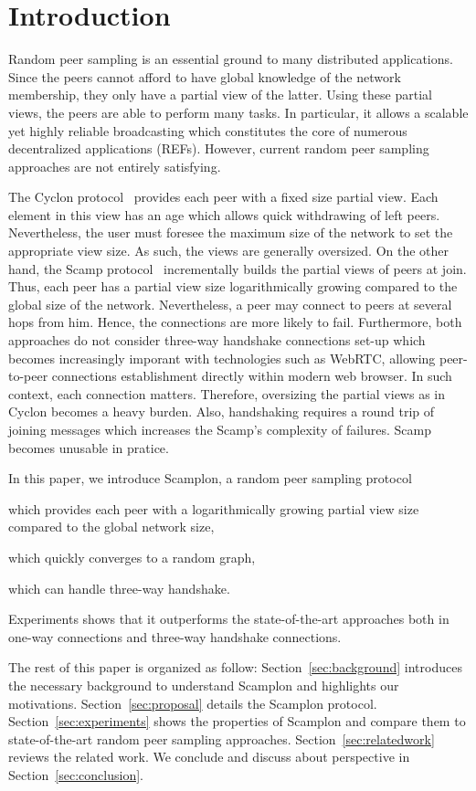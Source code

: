 
\section{Introduction}
Random peer sampling \cite{JGKvS04} is an essential ground to many distributed
applications. Since the peers cannot afford to have global knowledge of the
network membership, they only have a partial view of the latter. Using these
partial views, the peers are able to perform many tasks. In particular, it
allows a scalable yet highly reliable broadcasting which constitutes the core
of numerous decentralized applications (REFs). However, current random peer
sampling approaches are not entirely satisfying. 

The Cyclon protocol~\cite{voulgaris2005cyclon} provides each peer with a fixed
size partial view.  Each element in this view has an age which allows quick
withdrawing of left peers. Nevertheless, the user must foresee the maximum size
of the network to set the appropriate view size. As such, the views are
generally oversized. On the other hand, the Scamp
protocol~\cite{ganesh2001scamp,ganesh2003peer} incrementally builds the partial
views of peers at join. Thus, each peer has a partial view size logarithmically
growing compared to the global size of the network. Nevertheless, a peer may
connect to peers at several hops from him. Hence, the connections are more
likely to fail.  Furthermore, both approaches do not consider three-way
handshake connections set-up which becomes increasingly imporant with
technologies such as WebRTC, allowing peer-to-peer connections establishment
directly within modern web browser. In such context, each connection
matters. Therefore, oversizing the partial views as in Cyclon becomes a heavy
burden. Also, handshaking requires a round trip of joining messages which
increases the Scamp's complexity of failures. Scamp becomes unusable in
pratice.

In this paper, we introduce Scamplon, a random peer sampling protocol
\begin{inparaenum}[(i)]
\item which provides each peer with a logarithmically growing partial view size
  compared to the global network size,
\item which quickly converges to a random graph,
\item which can handle three-way handshake.
\end{inparaenum}
Experiments shows that it outperforms the state-of-the-art approaches both in
one-way connections and three-way handshake connections.

The rest of this paper is organized as follow: Section~\ref{sec:background}
introduces the necessary background to understand Scamplon and highlights our
motivations. Section~\ref{sec:proposal} details the Scamplon protocol.
Section~\ref{sec:experiments} shows the properties of Scamplon and compare them
to state-of-the-art random peer sampling
approaches. Section~\ref{sec:relatedwork} reviews the related work. We conclude
and discuss about perspective in Section~\ref{sec:conclusion}.

